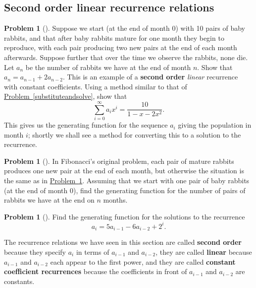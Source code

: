 \documentclass[10pt,]{book}
\newcommand{\terminology}[1]{\textbf{#1}}
\theoremstyle{plain}
\theoremstyle{definition}
\newtheorem{activity}[project]{Problem}
\theoremstyle{definition}
\numberwithin{equation}{chapter}
\newcommand{\importantarrow}{\Rightarrow}
\begin{document}
\subsection[{Second order linear recurrence relations}]{Second order linear recurrence relations}\label{subsection-48}
\begin{activity}[] \label{secondorderintroduction}
Suppose we start (at the end of month 0) with 10 pairs of baby rabbits, and that after baby rabbits mature for one month they begin to reproduce, with each pair producing two new pairs at the end of each month afterwards. Suppose further that over the time we observe the rabbits, none die. Let \(a_n\) be the number of rabbits we have at the end of month \(n\). Show that \(a_n=a_{n-1} + 2a_{n-2}\). This is an example of a \terminology{second order} \emph{linear} recurrence with constant coefficients. Using a method similar to that of \hyperref[substituteandsolve]{Problem~\ref{substituteandsolve}}, show that%
\begin{equation*}
\sum_{i=0}^\infty a_ix^i = \frac{10}{1-x-2x^2}.
\end{equation*}
This gives us the generating function for the sequence \(a_i\) giving the population in month \(i\); shortly we shall see a method for converting this to a solution to the recurrence.%
\end{activity}
\begin{activity}[] \label{originalFibonacci}
In Fibonacci's original problem, each pair of mature rabbits produces one new pair at the end of each month, but otherwise the situation is the same as in \hyperref[secondorderintroduction]{Problem~\ref{secondorderintroduction}}.  Assuming that we start with one pair of baby rabbits (at the end of month 0), find the generating function for the number of pairs of rabbits we have at the end on \(n\) months.%
\end{activity}
\begin{activity}[]\marginsymbol[-1em]{\pdftooltip{$\importantarrow$}{especially interesting}} \label{secondordernonhomo}
Find the generating function for the solutions to the recurrence%
\begin{equation*}
a_i=5a_{i-1}-6a_{i-2} + 2^i.
\end{equation*}
%
\end{activity}
The recurrence relations we have seen in this section are called \terminology{second order} because they specify \(a_i\) in terms of \(a_{i-1}\) and \(a_{i-2}\), they are called \terminology{linear} because \(a_{i-1}\) and \(a_{i-2}\) each appear to the first power, and they are called \terminology{constant coefficient recurrences} because the coefficients in front of \(a_{i-1}\) and \(a_{i-2}\) are constants.%
\typeout{************************************************}
\typeout{************************************************}
\end{document}
